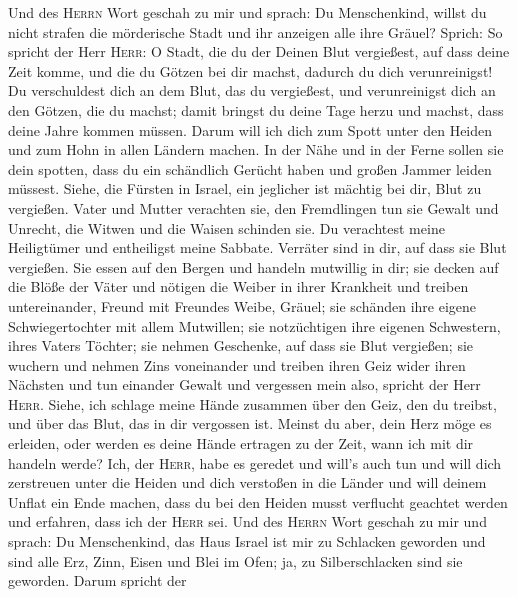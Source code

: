  Und des \textsc{Herrn} Wort geschah zu mir und sprach:
 Du Menschenkind, willst du nicht strafen die mörderische
Stadt und ihr anzeigen alle ihre Gräuel?  Sprich: So
spricht der Herr \textsc{Herr}: O Stadt, die du der Deinen Blut
vergießest, auf dass deine Zeit komme, und die du Götzen bei dir machst,
dadurch du dich verunreinigst!  Du verschuldest dich an
dem Blut, das du vergießest, und verunreinigst dich an den Götzen, die
du machst; damit bringst du deine Tage herzu und machst, dass deine
Jahre kommen müssen. Darum will ich dich zum Spott unter den Heiden und
zum Hohn in allen Ländern machen.  In der Nähe und in der
Ferne sollen sie dein spotten, dass du ein schändlich Gerücht haben und
großen Jammer leiden müssest.  Siehe, die Fürsten in
Israel, ein jeglicher ist mächtig bei dir, Blut zu vergießen.
 Vater und Mutter verachten sie, den Fremdlingen tun sie
Gewalt und Unrecht, die Witwen und die Waisen schinden sie.
 Du verachtest meine Heiligtümer und entheiligst meine
Sabbate.  Verräter sind in dir, auf dass sie Blut
vergießen. Sie essen auf den Bergen und handeln mutwillig in dir;
 sie decken auf die Blöße der Väter und nötigen die
Weiber in ihrer Krankheit  und treiben untereinander,
Freund mit Freundes Weibe, Gräuel; sie schänden ihre eigene
Schwiegertochter mit allem Mutwillen; sie notzüchtigen ihre eigenen
Schwestern, ihres Vaters Töchter;  sie nehmen Geschenke,
auf dass sie Blut vergießen; sie wuchern und nehmen Zins voneinander und
treiben ihren Geiz wider ihren Nächsten und tun einander Gewalt und
vergessen mein also, spricht der Herr \textsc{Herr}. 
Siehe, ich schlage meine Hände zusammen über den Geiz, den du treibst,
und über das Blut, das in dir vergossen ist.  Meinst du
aber, dein Herz möge es erleiden, oder werden es deine Hände ertragen zu
der Zeit, wann ich mit dir handeln werde? Ich, der \textsc{Herr}, habe
es geredet und will's auch tun  und will dich zerstreuen
unter die Heiden und dich verstoßen in die Länder und will deinem Unflat
ein Ende machen,  dass du bei den Heiden musst verflucht
geachtet werden und erfahren, dass ich der \textsc{Herr} sei.
 Und des \textsc{Herrn} Wort geschah zu mir und sprach:
 Du Menschenkind, das Haus Israel ist mir zu Schlacken
geworden und sind alle Erz, Zinn, Eisen und Blei im Ofen; ja, zu
Silberschlacken sind sie geworden.  Darum spricht der
